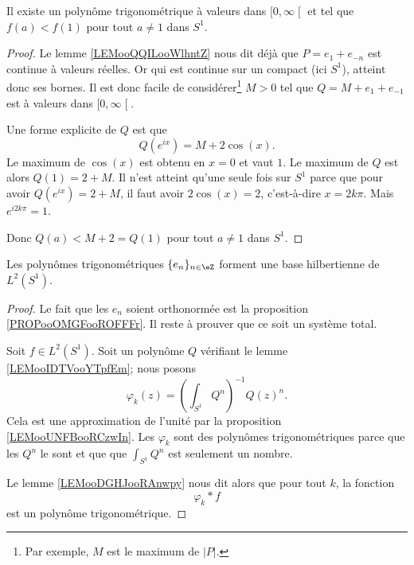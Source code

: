 \begin{lemma}       \label{LEMooIDTVooYTpfEm}
    Il existe un polynôme trigonométrique à valeurs dans \( \mathopen[ 0 , \infty \mathclose[\) et tel que \( f(a)<f(1)\) pour tout \( a\neq 1\) dans \( S^1\).
\end{lemma}

\begin{proof}
    Le lemme \ref{LEMooQQILooWlhntZ} nous dit déjà que \( P=e_1+e_{-n}\) est continue à valeurs réelles. Or qui est continue sur un compact (ici \( S^1\)), atteint donc ses bornes. Il est donc facile de considérer\footnote{Par exemple, \( M\) est le maximum de \( | P |\).} \( M>0\) tel que \( Q=M+e_1+e_{-1}\) est à valeurs dans \( \mathopen[ 0 , \infty \mathclose[\).

    Une forme explicite de \( Q\) est que
    \begin{equation}
        Q( e^{ix})=M+2\cos(x).
    \end{equation}
    Le maximum de \( \cos(x)\) est obtenu en \( x=0\) et vaut \( 1\). Le maximum de \( Q\) est alors \( Q(1)=2+M\). Il n'est atteint qu'une seule fois sur \( S^1\) parce que pour avoir \( Q( e^{ix})=2+M\), il faut avoir \( 2\cos(x)=2\), c'est-à-dire \( x=2k\pi\). Mais \(  e^{i2k\pi}=1\).

    Donc \( Q(a)<M+2=Q(1)\) pour tout \( a\neq 1\) dans \( S^1\).
\end{proof}

\begin{proposition}
    Les polynômes trigonométriques \( \{ e_n \}_{n\in \eZ}\) forment une base hilbertienne de \( L^2(S^1)\).
\end{proposition}

\begin{proof}
    Le fait que les \( e_n\) soient orthonormée est la proposition \ref{PROPooOMGFooROFFFr}. Il reste à prouver que ce soit un système total. 
    
    Soit \( f\in L^2(S^1)\). Soit un polynôme \( Q\) vérifiant le lemme \ref{LEMooIDTVooYTpfEm}; nous posons
    \begin{equation}
        \varphi_k(z)=\left( \int_{S^1}Q^n \right)^{-1}Q(z)^n.
    \end{equation}
    Cela est une approximation de l'unité par la proposition \ref{LEMooUNFBooRCzwIn}. Les \( \varphi_k\) sont des polynômes trigonométriques parce que les \( Q^n\) le sont et que que \( \int_{S^1}Q^n\) est seulement un nombre.

    Le lemme \ref{LEMooDGHJooRAnwpy} nous dit alors que pour tout \( k\), la fonction
    \begin{equation}
        \varphi_k*f
    \end{equation}
    est un polynôme trigonométrique.
\end{proof}

